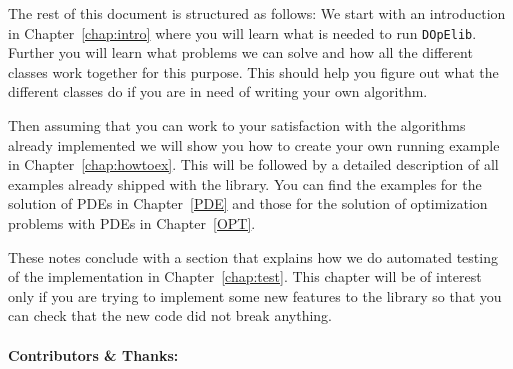 The rest of this document is structured as follows: We start with an introduction in
Chapter~\ref{chap:intro} where you will learn what is needed to run {\tt DOpElib}. 
Further you will learn what problems we can solve and how all the different classes 
work together for this purpose. This should help you figure out what the different classes
do if you are in need of writing your own algorithm.

Then assuming that you can work to your satisfaction with the algorithms already implemented
we will show you how to create your own running example in Chapter~\ref{chap:howtoex}.
This will be followed by a detailed description of all examples already shipped with 
the library. You can find the examples for the solution of PDEs in Chapter~\ref{PDE}
and those for the solution of optimization problems with PDEs in Chapter~\ref{OPT}.

These notes conclude with a section that explains how we do automated testing of the 
implementation in Chapter~\ref{chap:test}. This chapter will be of interest only if you 
are trying to implement some new features to the library so that you can check that 
the new code did not break anything.

\paragraph{Contributors \& Thanks:}

